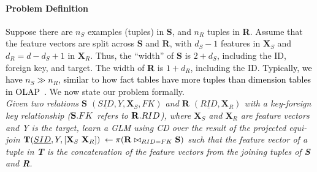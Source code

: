 \documentclass{vldb}
\begin{document}
\paragraph*{Problem Definition}
Suppose there are $n_S$ examples (tuples) in \textbf{S}, and $n_R$ tuples in \textbf{R}.
Assume that the feature vectors are split across \textbf{S} and \textbf{R},
with $d_S - 1$ features in $\textbf{X}_S$ and $d_R = d - d_S + 1$ in $\textbf{X}_R$.
Thus, the ``width'' of \textbf{S} is $2 + d_S$, including the ID, foreign key,
and target.
The width of \textbf{R} is $1 + d_R$, including the ID.
\textcolor{black}{Typically, we have $n_S \gg n_R$, similar to how fact tables
have more tuples than dimension tables in OLAP~\cite{cowbook}\cite{datacube}.}
We now state our problem formally. 
\vspace{1mm}\\
\noindent \textit{Given two relations \textnormal{$\textbf{S}$} $(\underline{SID}, Y, \textbf{X}_S, FK)$
and \textnormal{$\textbf{R}$} $(\underline{RID}, \textbf{X}_R)$
with a key-foreign key relationship ($\textnormal{\textbf{S}}.FK$ refers to $\textnormal{\textbf{R}}.RID$),
where $\textbf{X}_S$ and $\textbf{X}_R$ are feature vectors and Y is the target,
learn a GLM using CD over the result of the projected equi-join
$\textnormal{\textbf{T}} (\underline{SID}, Y, \lbrack \textbf{X}_S ~\textbf{X}_R \rbrack)$
$\leftarrow \pi (\textnormal{\textbf{R}} \bowtie_{RID = FK} \textnormal{\textbf{S}})$ such that the
feature vector of a tuple in \textnormal{\textbf{T}} is the concatenation of the feature
vectors from the joining tuples of \textnormal{\textbf{S}} and \textnormal{\textbf{R}}.}
\end{document}
